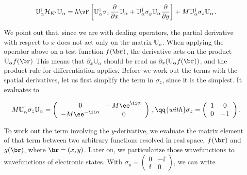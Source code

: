 \begin{equation}
    \label{eq:transformed_H0}
    \mathbb{U}_{\alpha}^{\dagger}\mathcal{H}_{K'} \mathbb{U}_{\alpha}=\hbar \vF  \left[\mathbb{U}_{\alpha}^{\dagger}\sigma_{x}\frac{\partial}{\partial x}\mathbb{U}_{\alpha}+\mathbb{U}_{\alpha}^{\dagger}\sigma_{y}\mathbb{U}_{\alpha}\frac{\partial}{\partial y}\right] + M \mathbb{U}_{\alpha}^{\dagger}\sigma_{z}\mathbb{U}_{\alpha}\,.
\end{equation}

\noindent We point out that, since we are with dealing operators, the partial derivative with respect to $x$ does not act only on the matrix $\mathbb{U}_{\alpha}$.
When applying the operator above on a test function $f(\br)$, the derivative acts on the product $\mathbb{U}_{\alpha} f(\br)$
This means that $\partial_x \mathbb{U}_{\alpha}$ should be read as $\partial_x (\mathbb{U}_{\alpha} f(\br))$, and the product rule for differentiation applies.
Before we work out the terms with the spatial derivatives, let us first simplify the term in $\sigma_{z}$, since it is the simplest.
It evaluates to

\begin{equation}
    M  \mathbb{U}_{\alpha}^{\dagger}\sigma_{z} \mathbb{U}_{\alpha}=\left(\begin{array}{cc}
                                                        0 & -M \ee^{\ii \alpha}\\
                                                        -M \ee^{-\ii \alpha} & 0
    \end{array}\right)\,, \qq{with} 
    \sigma_z = \left(\begin{array}{cc}
                1 & 0 \\
                0 & -1
               \end{array}\right).
\end{equation}

\noindent To work out the term involving the $y$-derivative, we evaluate the matrix element of that term between two arbitrary functions resolved in real space, $f(\br)$ and $g(\br)$, where $\br=(x,y)$.
Later on, we particularize those wavefunctions to wavefunctions of electronic states.
With $\sigma_y = \left(\begin{array}{cc}
                0 & -\ii \\
                \ii & 0
               \end{array}\right)$, we can write

